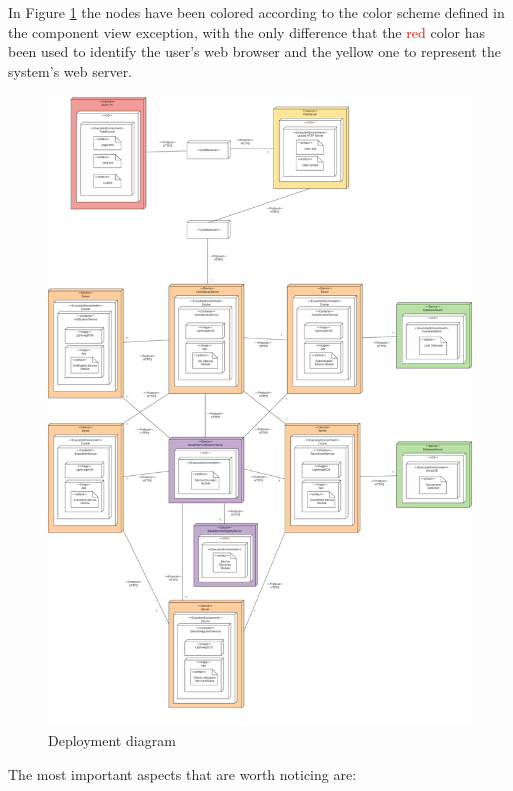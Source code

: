In Figure \ref{deployment_diagram} the nodes have been colored according to the color scheme defined in the component view exception, with the only difference that the \textcolor{red}{red} color has been used to identify the user's web browser and the \textcolor{myyellow}{yellow} one to represent the system's web server.
\begin{figure}[H]
    \centering
    \vspace{-4cm}
    \hspace{1cm}
    \includegraphics[width=1.1\textwidth]{Diagrams/deployment_diagram.png}
    \caption{Deployment diagram}
    \label{deployment_diagram}
\end{figure}
The most important aspects that are worth noticing are:
